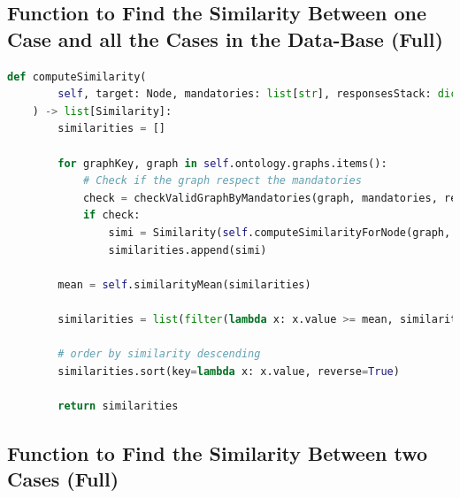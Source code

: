 \clearpage
\subsection{Function to Find the Similarity Between one Case and all the Cases in the Data-Base (Full)\label{annex:comp-sim-full}}

\begin{lstlisting}[language=Python, caption=Function to Find the Similarity Between One Case and All the Cases in the Data-Base (Full), label={lst:comp-sim-full}]
def computeSimilarity(
        self, target: Node, mandatories: list[str], responsesStack: dict[str, Any]
    ) -> list[Similarity]:
        similarities = []

        for graphKey, graph in self.ontology.graphs.items():
            # Check if the graph respect the mandatories
            check = checkValidGraphByMandatories(graph, mandatories, responsesStack)
            if check:
                simi = Similarity(self.computeSimilarityForNode(graph, target), graph)
                similarities.append(simi)

        mean = self.similarityMean(similarities)

        similarities = list(filter(lambda x: x.value >= mean, similarities))

        # order by similarity descending
        similarities.sort(key=lambda x: x.value, reverse=True)

        return similarities
\end{lstlisting}



\clearpage
\subsection{Function to Find the Similarity Between two Cases (Full)\label{annex:comp-sim-node-full}}

